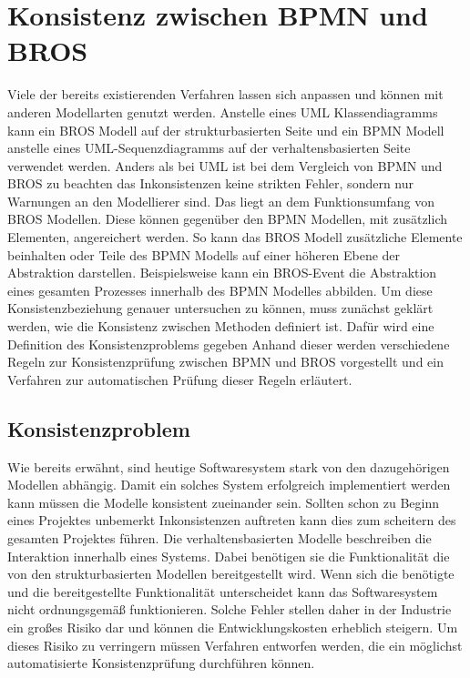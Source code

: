 \chapter{Konsistenz zwischen BPMN und BROS}
\label{chap:consistency}

Viele der bereits existierenden Verfahren lassen sich anpassen und können mit anderen Modellarten genutzt werden. 
Anstelle eines UML Klassendiagramms kann ein BROS Modell auf der strukturbasierten Seite und ein BPMN Modell anstelle eines UML-Sequenzdiagramms auf der verhaltensbasierten Seite verwendet werden.
Anders als bei UML ist bei dem Vergleich von BPMN und BROS zu beachten das Inkonsistenzen keine strikten Fehler, sondern nur Warnungen an den Modellierer sind.
Das liegt an dem Funktionsumfang von BROS Modellen.
Diese können gegenüber den BPMN Modellen, mit zusätzlich Elementen, angereichert werden.
So kann das BROS Modell zusätzliche Elemente beinhalten oder Teile des BPMN Modells auf einer höheren Ebene der Abstraktion darstellen.
Beispielsweise kann ein BROS-Event die Abstraktion eines gesamten Prozesses innerhalb des BPMN Modelles abbilden.
Um diese Konsistenzbeziehung genauer untersuchen zu können, muss zunächst geklärt werden, wie die Konsistenz zwischen Methoden definiert ist.
Dafür wird eine Definition des Konsistenzproblems gegeben
Anhand dieser werden verschiedene Regeln zur Konsistenzprüfung zwischen BPMN und BROS vorgestellt und ein Verfahren zur automatischen Prüfung dieser Regeln erläutert.

\section{Konsistenzproblem}

Wie bereits erwähnt, sind heutige Softwaresystem stark von den dazugehörigen Modellen abhängig.
Damit ein solches System erfolgreich implementiert werden kann müssen die Modelle konsistent zueinander sein.
Sollten schon zu Beginn eines Projektes unbemerkt Inkonsistenzen auftreten kann dies zum scheitern des gesamten Projektes führen.
Die verhaltensbasierten Modelle beschreiben die Interaktion innerhalb eines Systems.
Dabei benötigen sie die Funktionalität die von den strukturbasierten Modellen bereitgestellt wird.
Wenn sich die benötigte und die bereitgestellte Funktionalität unterscheidet kann das Softwaresystem nicht ordnungsgemäß funktionieren.
Solche Fehler stellen daher in der Industrie ein großes Risiko dar und können die Entwicklungskosten erheblich steigern.
Um dieses Risiko zu verringern müssen Verfahren entworfen werden, die ein möglichst automatisierte Konsistenzprüfung durchführen können.

